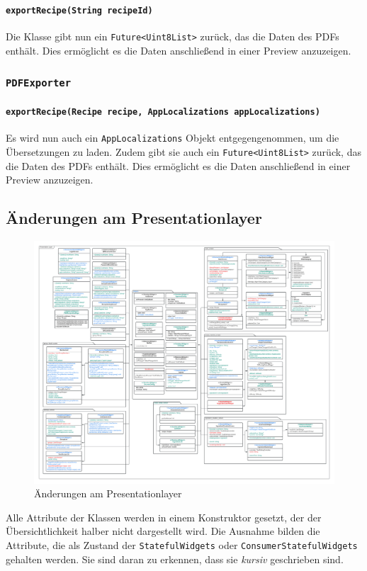 \documentclass{implementierungsheft}
\begin{document}
\paragraph{\texttt{exportRecipe(String recipeId)}}
Die Klasse gibt nun ein \texttt{Future<Uint8List>} zurück, das die Daten des PDFs enthält. Dies ermöglicht es die Daten anschließend in einer Preview anzuzeigen.
\subsubsection{\texttt{PDFExporter}}
\paragraph{\texttt{exportRecipe(Recipe recipe, AppLocalizations appLocalizations)}}
Es wird nun auch ein \texttt{AppLocalizations} Objekt entgegengenommen, um die Übersetzungen zu laden. Zudem gibt sie auch ein \texttt{Future<Uint8List>} zurück, das die Daten des PDFs enthält. Dies ermöglicht es die Daten anschließend in einer Preview anzuzeigen.
\newpage
\subsection{Änderungen am Presentationlayer}
\begin{figure}[htp]
    \centering
    \includegraphics[width=\textwidth]{images/uml/presentationLayer.pdf}
    \caption{Änderungen am Presentationlayer}
    \label{fig:presentationLayer}
\end{figure}
Alle Attribute der Klassen werden in einem Konstruktor gesetzt, der der Übersichtlichkeit halber nicht dargestellt wird. Die Ausnahme bilden die Attribute, die als Zustand der \texttt{StatefulWidgets} oder \texttt{ConsumerStatefulWidgets} gehalten werden. Sie sind daran zu erkennen, dass sie \textit{kursiv} geschrieben sind.
\end{document}
